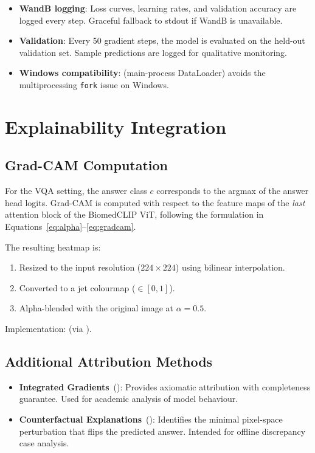 \begin{itemize}
  \item \textbf{WandB logging}: Loss curves, learning rates, and validation
        accuracy are logged every step. Graceful fallback to stdout if WandB
        is unavailable.
  \item \textbf{Validation}: Every 50 gradient steps, the model is evaluated
        on the held-out validation set. Sample predictions are logged for
        qualitative monitoring.
  \item \textbf{Windows compatibility}:  (main-process
        DataLoader) avoids the multiprocessing \texttt{fork} issue on Windows.
\end{itemize}

\section{Explainability Integration}
\label{sec:explainability}

\subsection{Grad-CAM Computation}
\label{subsec:gradcam_impl}

For the VQA setting, the answer class $c$ corresponds to the argmax of the
answer head logits. Grad-CAM is computed with respect to the feature maps
of the \emph{last} attention block of the BiomedCLIP ViT, following
the formulation in Equations~\ref{eq:alpha}--\ref{eq:gradcam}.

The resulting heatmap is:
\begin{enumerate}
  \item Resized to the input resolution ($224 \times 224$) using bilinear
        interpolation.
  \item Converted to a jet colourmap ($\in [0,1]$).
  \item Alpha-blended with the original image at $\alpha = 0.5$.
\end{enumerate}
Implementation:  (via
).

\subsection{Additional Attribution Methods}
\label{subsec:xai_additional}

\begin{itemize}
  \item \textbf{Integrated Gradients}~():
        Provides axiomatic attribution with completeness guarantee.
        Used for academic analysis of model behaviour.
  \item \textbf{Counterfactual Explanations}~():
        Identifies the minimal pixel-space perturbation that flips the
        predicted answer. Intended for offline discrepancy case analysis.
\end{itemize}

